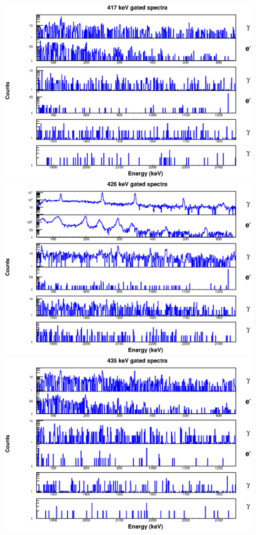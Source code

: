 \includegraphics[scale=0.8]{154Gd_Appendix/417_combined.eps}
\includegraphics[scale=0.8]{154Gd_Appendix/426_combined.eps}
\includegraphics[scale=0.8]{154Gd_Appendix/435_combined.eps}
